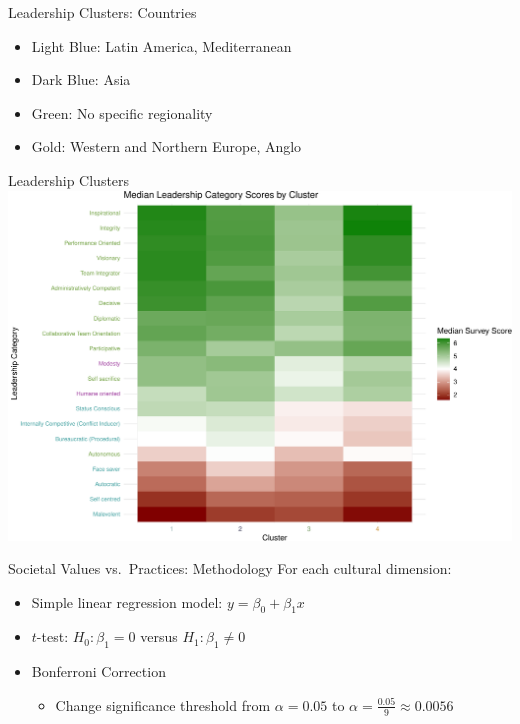 \documentclass[
  ignorenonframetext,
]{beamer}
\providecommand{\tightlist}{%
  \setlength{\itemsep}{0pt}\setlength{\parskip}{0pt}}
\begin{document}
\begin{frame}{Leadership Clusters: Countries}
\protect\hypertarget{leadership-clusters-countries-1}{}

\begin{itemize}
\tightlist
\item
  \textcolor{clust4}{Light Blue}: Latin America, Mediterranean
\item
  \textcolor{clust5}{Dark Blue}: Asia
\item
  \textcolor{clust6}{Green}: No specific regionality
\item
  \textcolor{clust7}{Gold}: Western and Northern Europe, Anglo
\end{itemize}
\end{frame}

\begin{frame}{Leadership Clusters}
\protect\hypertarget{leadership-clusters}{}
\includegraphics{final_slides_files/figure-beamer/cluster_values-1.pdf}
\end{frame}

\begin{frame}{Societal Values vs.~Practices: Methodology}
\protect\hypertarget{societal-values-vs.-practices-methodology}{}
For each cultural dimension:

\begin{itemize}
\item
  Simple linear regression model: \(y = \beta_0 + \beta_1 x\)
\item
  \(t\)-test: \(H_0: \beta_1 = 0\) versus \(H_1: \beta_1 \ne 0\)
\item
  Bonferroni Correction

  \begin{itemize}
  \tightlist
  \item
    Change significance threshold from \(\alpha = 0.05\) to
    \(\alpha = \frac{0.05}{9} \approx 0.0056\)
  \end{itemize}
\end{itemize}
\end{frame}
\end{document}
